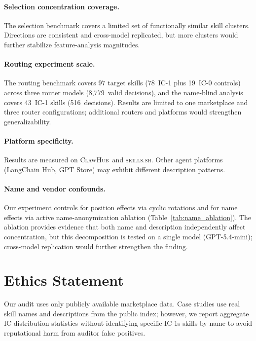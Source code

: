 \documentclass[11pt]{article}
\newcommand{\clawhub}{\textsc{ClawHub}\xspace}
\newcommand{\skillssh}{\textsc{skills.sh}\xspace}
\begin{document}
\paragraph{Selection concentration coverage.}
The selection benchmark covers a limited set of
functionally similar skill clusters.
Directions are consistent and cross-model replicated,
but more clusters would further stabilize feature-analysis
magnitudes.

\paragraph{Routing experiment scale.}
The routing benchmark covers 97 target skills (78~IC-1
plus 19~IC-0 controls) across three
router models (8,779~valid decisions), and the name-blind
analysis covers 43~IC-1 skills (516~decisions).
Results are limited to one marketplace and three router
configurations; additional routers and platforms would
strengthen generalizability.

\paragraph{Platform specificity.}
Results are measured on \clawhub\ and \skillssh.
Other agent platforms (LangChain Hub, GPT Store)
may exhibit different description patterns.

\paragraph{Name and vendor confounds.}
Our experiment controls for position effects via
cyclic rotations and for name effects via active
name-anonymization ablation
(Table~\ref{tab:name_ablation}).
The ablation provides evidence that both name
and description independently affect concentration,
but this decomposition is tested on a single model
(GPT-5.4-mini); cross-model replication would
further strengthen the finding.

\section*{Ethics Statement}

Our audit uses only publicly available marketplace data.
Case studies use real skill names and descriptions from the
public index; however, we report aggregate IC distribution
statistics without identifying specific IC-1s skills by name
to avoid reputational harm from auditor false positives.
\end{document}
